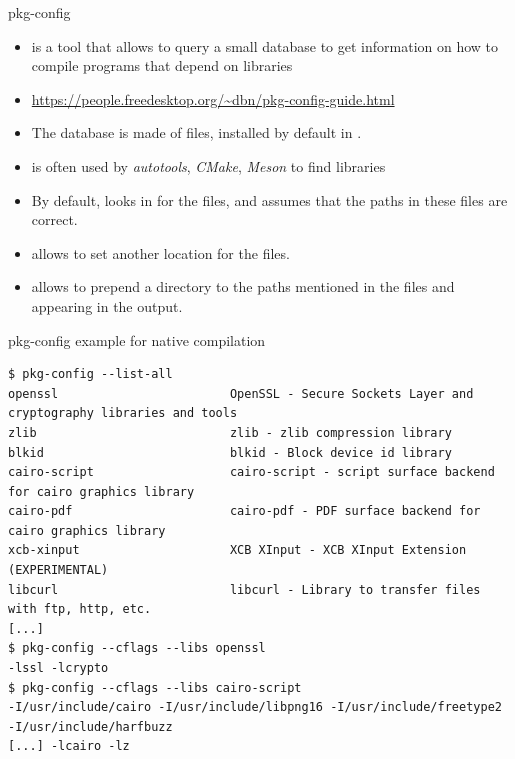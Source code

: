 \begin{frame}{pkg-config}
  \begin{itemize}
  \item {} is a tool that allows to query a small
    database to get information on how to compile programs that depend
    on libraries
  \item \url{https://people.freedesktop.org/~dbn/pkg-config-guide.html}
  \item The database is made of  files, installed by default in
    .
  \item {} is often used by {\em autotools}, {\em
      CMake}, {\em Meson} to find libraries
  \item By default,  looks in
     for the  files, and assumes
    that the paths in these files are correct.
  \item {} allows to set another location for the
     files.
  \item {} allows to prepend a directory to the
    paths mentioned in the  files and appearing in the
     output.
  \end{itemize}
\end{frame}

\begin{frame}[fragile]{pkg-config example for native compilation}
  \begin{block}{}
    {\scriptsize
\begin{verbatim}
$ pkg-config --list-all
openssl                        OpenSSL - Secure Sockets Layer and cryptography libraries and tools
zlib                           zlib - zlib compression library
blkid                          blkid - Block device id library
cairo-script                   cairo-script - script surface backend for cairo graphics library
cairo-pdf                      cairo-pdf - PDF surface backend for cairo graphics library
xcb-xinput                     XCB XInput - XCB XInput Extension (EXPERIMENTAL)
libcurl                        libcurl - Library to transfer files with ftp, http, etc.
[...]
$ pkg-config --cflags --libs openssl
-lssl -lcrypto
$ pkg-config --cflags --libs cairo-script
-I/usr/include/cairo -I/usr/include/libpng16 -I/usr/include/freetype2 -I/usr/include/harfbuzz
[...] -lcairo -lz
\end{verbatim}
    }
  \end{block}
\end{frame}


